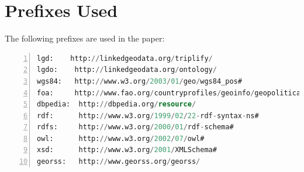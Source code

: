 %
%


\section{Prefixes Used}
\label{sec:prefixes}

The following prefixes are used in the paper:

\begin{ttfamily}
\begin{lstlisting}[language=SQL,basicstyle=\scriptsize,numbers=left,numberstyle=\tiny,breaklines=true,breakindent=0cm,breakautoindent=false,morekeywords={OPTIONAL,FILTER}]
lgd:    http://linkedgeodata.org/triplify/
lgdo:    http://linkedgeodata.org/ontology/
wgs84:   http://www.w3.org/2003/01/geo/wgs84_pos#
foa:     http://www.fao.org/countryprofiles/geoinfo/geopolitical/resource/
dbpedia:  http://dbpedia.org/resource/
rdf:      http://www.w3.org/1999/02/22-rdf-syntax-ns#
rdfs:     http://www.w3.org/2000/01/rdf-schema#
owl:      http://www.w3.org/2002/07/owl#
xsd:      http://www.w3.org/2001/XMLSchema#
georss:   http://www.georss.org/georss/
\end{lstlisting}
\end{ttfamily}

%


